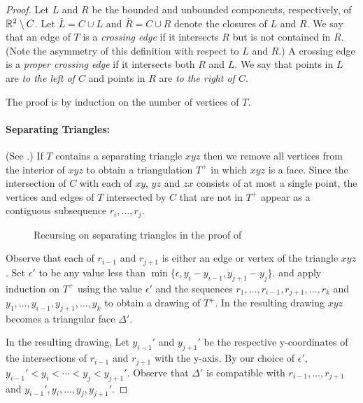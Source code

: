 \documentclass{patmorin}
\begin{document}
\begin{proof}
   Let $L$ and $R$ be the bounded
   and unbounded components, respectively, of $\mathbb{R}^2\setminus C$. Let
   $\bar{L}=C\cup L$ and $\bar{R}=C\cup R$ denote the closures of $L$
   and $R$.  We say that an edge of $T$ is a \emph{crossing edge} if
   it intersects $R$ but is not contained in $R$.  (Note the asymmetry
   of this definition with respect to $L$ and $R$.)  A crossing edge
   is a \emph{proper crossing edge} if it intersects both $R$ and $L$.
   We say that points in $L$ are \emph{to the left of $C$} and points
   in $R$ are \emph{to the right of $C$}.

   The proof is by induction on the number of vertices of $T$.

   \paragraph{Separating Triangles:}
   (See .)
   If $T$ contains a separating triangle $xyz$ then we remove all vertices
   from the interior of $xyz$ to obtain a triangulation $T^+$ in which
   $xyz$ is a face.  Since the intersection of $C$ with each of $xy$,
   $yz$ and $zx$ consists of at most a single point, the vertices and
   edges of $T$ intersected by $C$ that are not in $T^+$ appear as a
   contiguous subsequence $r_i,\ldots,r_j$.

   \begin{figure}
      \caption{Recursing on separating triangles in the proof of
      }
   \end{figure}

   Observe that each of $r_{i-1}$ and $r_{j+1}$ is either an edge
   or vertex of the triangle $xyz$.  Set $\epsilon'$ to be any
   value less than $\min\{\epsilon,y_{i}-y_{i-1}, y_{j+1}-y_j\}$.
   and apply induction on $T^+$ using the value $\epsilon'$
   and the sequences $r_1,\ldots,r_{i-1},r_{j+1},\ldots,r_k$ and
   $y_1,\ldots,y_{i-1},y_{j+1},\ldots,y_k$ to obtain a drawing of $T^+$.
   In the resulting drawing $xyz$ becomes a triangular face $\Delta'$.

   In the resulting drawing, Let $y_{i-1}'$ and $y_{j+1}'$
   be the respective y-coordinates of the intersections of
   $r_{i-1}$ and $r_{j+1}$ with the y-axis.  By our choice of
   $\epsilon'$, $y_{i-1}'<y_i<\cdots<y_j<y_{j+1}'$.  Observe that
   $\Delta'$ is compatible with $r_{i-1},\ldots,r_{j+1}$ and
   $y_{i-1}',y_i,\ldots,y_j,y_{j+1}'$.


\end{proof}
\end{document}
